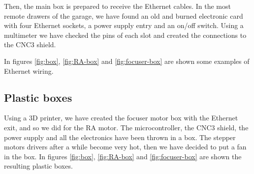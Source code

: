 Then, the main box is prepared to receive the Ethernet cables.
In the most remote drawers of the garage, we have found an old and burned electronic card with four Ethernet sockets, a power supply entry and an on/off switch.
Using a multimeter we have checked the pins of each slot and created the connections to the CNC3 shield.

In figures \ref{fig:box}, \ref{fig:RA-box} and \ref{fig:focuser-box} are shown some examples of Ethernet wiring.

\subsection{Plastic boxes}
Using a 3D printer, we have created the focuser motor box with the Ethernet exit, and so we did for the RA motor.
The microcontroller, the CNC3 shield, the power supply and all the electronics have been thrown in a box.
The stepper motors drivers after a while become very hot, then we have decided to put a fan in the box.
In figures \ref{fig:box}, \ref{fig:RA-box} and \ref{fig:focuser-box} are shown the resulting plastic boxes.